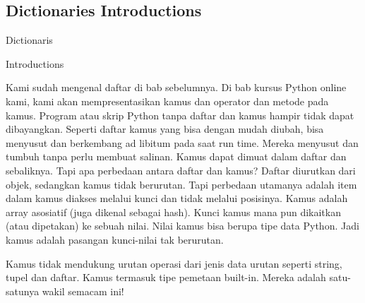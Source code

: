 \vspace{\baselineskip}
\vspace{\baselineskip}
\vspace{\baselineskip}
\vspace{\baselineskip}
\subsection{Dictionaries Introductions}
\vspace{\baselineskip}
\noindent Dictionaris\par


\noindent \hspace*{0.5in}Introductions\par


\noindent \hspace*{0.5in}Kami sudah mengenal daftar di bab sebelumnya. Di bab kursus Python online kami, kami \hspace*{0.5in}akan mempresentasikan kamus dan operator dan metode pada kamus. Program atau skrip \hspace*{0.5in}Python tanpa daftar dan kamus hampir tidak dapat dibayangkan. Seperti daftar kamus yang \hspace*{0.5in}bisa dengan mudah diubah, bisa menyusut dan berkembang ad libitum pada saat run time. \hspace*{0.5in}Mereka menyusut dan tumbuh tanpa perlu membuat salinan. Kamus dapat dimuat dalam \hspace*{0.5in}daftar dan sebaliknya. Tapi apa perbedaan antara daftar dan kamus? Daftar diurutkan dari \hspace*{0.5in}objek, sedangkan kamus tidak berurutan. Tapi perbedaan utamanya adalah item dalam \hspace*{0.5in}kamus diakses melalui kunci dan tidak melalui posisinya. Kamus adalah array asosiatif \hspace*{0.5in}(juga dikenal sebagai hash). Kunci kamus mana pun dikaitkan (atau dipetakan) ke sebuah \hspace*{0.5in}nilai. Nilai kamus bisa berupa tipe data Python. Jadi kamus adalah pasangan kunci-nilai \hspace*{0.5in}tak berurutan.\par


\vspace{\baselineskip}
\noindent \hspace*{0.5in}Kamus tidak mendukung urutan operasi dari jenis data urutan seperti string, tupel dan \hspace*{0.5in}daftar. Kamus termasuk tipe pemetaan built-in. Mereka adalah satu-satunya wakil \hspace*{0.5in}semacam ini!\par


